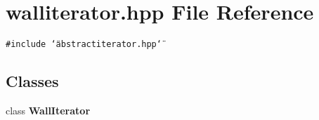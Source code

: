 \section{walliterator.hpp File Reference}
\label{walliterator_8hpp}
{\tt \#include \char`\"{}abstractiterator.hpp\char`\"{}}\par
\subsection*{Classes}
\begin{CompactItemize}
\item 
class {\bf Wall\-Iterator}
\end{CompactItemize}
